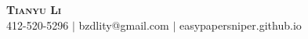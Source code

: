 \documentclass[letterpaper,11pt]{article}
\begin{document}

\begin{center}
    \textbf{\Huge \scshape Tianyu Li} \\ \vspace{1pt}
    \small 412-520-5296 $|$ 
    {bzdlity@gmail.com} $|$ easypapersniper.github.io
\end{center}




% 
% 






\end{document}
